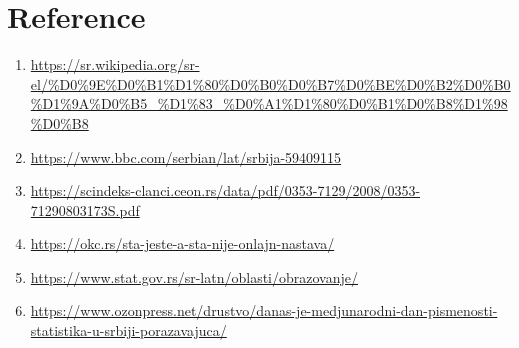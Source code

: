 \documentclass[12pt,twoside]{article}
\begin{document}
\section{Reference}
\begin{enumerate}
\item \url{https://sr.wikipedia.org/sr-el/%D0%9E%D0%B1%D1%80%D0%B0%D0%B7%D0%BE%D0%B2%D0%B0%D1%9A%D0%B5_%D1%83_%D0%A1%D1%80%D0%B1%D0%B8%D1%98%D0%B8}
\item \url{https://www.bbc.com/serbian/lat/srbija-59409115}
\item \url{https://scindeks-clanci.ceon.rs/data/pdf/0353-7129/2008/0353-71290803173S.pdf}
\item \url{https://okc.rs/sta-jeste-a-sta-nije-onlajn-nastava/}
\item \url{https://www.stat.gov.rs/sr-latn/oblasti/obrazovanje/}
\item \url{https://www.ozonpress.net/drustvo/danas-je-medjunarodni-dan-pismenosti-statistika-u-srbiji-porazavajuca/}
\end{enumerate}
\end{document}
